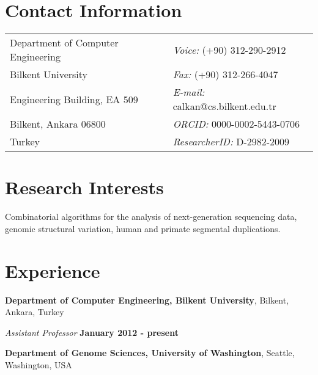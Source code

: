 \documentclass[margin,line]{res}
\begin{document}

\begin{resume}

  \section{\sc Contact Information}
  \vspace{.05in}
  \begin{tabular}{@{}p{3in}p{4in}}
    Department of Computer Engineering & {\it Voice:}  (+90) 312-290-2912 \\            
    Bilkent University   & {\it Fax:}    (+90) 312-266-4047 \\         
    Engineering Building, EA 509   & {\it E-mail:}  calkan@cs.bilkent.edu.tr\\        %
    Bilkent, Ankara 06800 & {\it ORCID: } 0000-0002-5443-0706\\ 
    Turkey & {\it ResearcherID: } D-2982-2009\\ 
  \end{tabular}
  
  
  \section{\sc Research Interests}
  Combinatorial algorithms for the analysis of next-generation sequencing data, 
  genomic structural variation,  human and primate
  segmental duplications. %

          \section{\sc Experience}
                  {\bf Department of Computer Engineering, Bilkent University},
                  Bilkent, Ankara, Turkey
                  
                  \vspace{-.2cm}
                         {\em Assistant Professor} \hfill {\bf January 2012 - present} 
                         
                         
                         {\bf Department of Genome Sciences, University of Washington},
                         Seattle, Washington, USA
                         

\end{resume}
\end{document}
